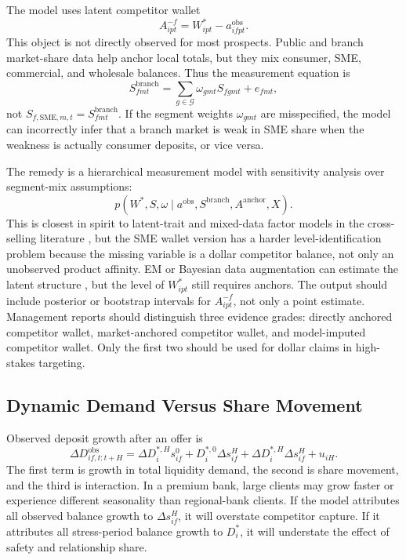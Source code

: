 \documentclass[11pt]{article}
\begin{document}
The model uses latent competitor wallet
\[
  A_{ipt}^{-f}=W_{ipt}^{*}-a_{ifpt}^{\mathrm{obs}}.
\]
This object is not directly observed for most prospects. Public and branch
market-share data help anchor local totals, but they mix consumer, SME,
commercial, and wholesale balances. Thus the measurement equation is
\[
  S_{fmt}^{\mathrm{branch}}
  =
  \sum_{g\in\mathcal{G}}\omega_{gmt}S_{fgmt}+e_{fmt},
\]
not $S_{f,\mathrm{SME},m,t}=S_{fmt}^{\mathrm{branch}}$. If the segment weights
$\omega_{gmt}$ are misspecified, the model can incorrectly infer that a branch
market is weak in SME share when the weakness is actually consumer deposits, or
vice versa.

The remedy is a hierarchical measurement model with sensitivity analysis over
segment-mix assumptions:
\[
  p(W^{*},S,\omega\mid
  a^{\mathrm{obs}},S^{\mathrm{branch}},A^{\mathrm{anchor}},X).
\]
This is closest in spirit to latent-trait and mixed-data factor models in the
cross-selling literature \citep{kamakura1991latent,kamakura2003database}, but
the SME wallet version has a harder level-identification problem because the
missing variable is a dollar competitor balance, not only an unobserved product
affinity. EM or Bayesian data augmentation can estimate the latent structure
\citep{dempster1977em}, but the level of $W_{ipt}^{*}$ still requires anchors.
The output should include posterior or bootstrap intervals for
$A_{ipt}^{-f}$, not only a point estimate. Management reports should distinguish
three evidence grades: directly anchored competitor wallet, market-anchored
competitor wallet, and model-imputed competitor wallet. Only the first two
should be used for dollar claims in high-stakes targeting.

\subsection{Dynamic Demand Versus Share Movement}

Observed deposit growth after an offer is
\[
  \Delta D_{if,t:t+H}^{\mathrm{obs}}
  =
  \Delta D_{i}^{*,H}s_{if}^{0}
  +D_{i}^{*,0}\Delta s_{if}^{H}
  +\Delta D_{i}^{*,H}\Delta s_{if}^{H}
  +u_{iH}.
\]
The first term is growth in total liquidity demand, the second is share
movement, and the third is interaction. In a premium bank, large clients may
grow faster or experience different seasonality than regional-bank clients.
If the model attributes all observed balance growth to $\Delta s_{if}^{H}$, it
will overstate competitor capture. If it attributes all stress-period balance
growth to $D_i^{*}$, it will understate the effect of safety and relationship
share.
\end{document}
